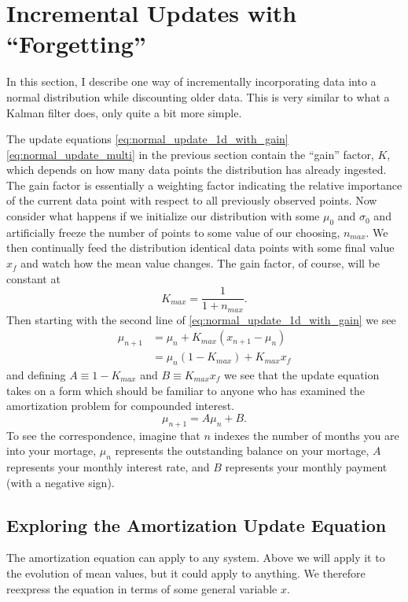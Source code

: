 \documentclass[../../main.tex]{subfiles}
\begin{document}
\section{Incremental Updates with ``Forgetting''}
In this section, I describe one way of incrementally incorporating data into a
normal distribution while discounting older data.  This is very similar to what
a Kalman filter does, only quite a bit more simple.

The update equations \eqref{eq:normal_update_1d_with_gain}
\eqref{eq:normal_update_multi} in the previous section contain the ``gain''
factor, $K$, which depends on how many data points the distribution has already
ingested.  The gain factor is essentially a weighting factor indicating the
relative importance of the current data point with respect to all previously
observed points.  Now consider what happens if we initialize our distribution
with some $\mu_0$ and $\sigma_0$ and artificially freeze the number of points to
some value of our choosing, $n_{max}$.  We then continually feed the
distribution identical data points with some final value $x_f$ and watch how
the mean value changes.  The gain factor, of course, will be constant at
\begin{equation}
    \label{eq:k_const}
    K_{max} = \frac{1}{1 + n_{max}}.
\end{equation}
Then starting with the second line of
\eqref{eq:normal_update_1d_with_gain} we see
\begin{align}
    \label{eq:interest}
    \mu_{n+1} &= \mu_n  + K_{max} \left( x_{n+1} - \mu_n \right)\nonumber\\
              &= \mu_n (1 - K_{max}) + K_{max}x_f
\end{align}
and defining $A \equiv 1-K_{max}$ and $B \equiv K_{max} x_f$
we see that the update equation takes on a form which should be familiar to
anyone who has examined the amortization problem for compounded interest.
\begin{equation}
    \label{eq:interest}
    \mu_{n+1} = A \mu_n + B.
\end{equation}
To see the correspondence, imagine that $n$ indexes the number of months you
are into your mortage, $\mu_n$ represents the outstanding balance on your
mortage, $A$ represents your monthly interest rate, and $B$ represents your
monthly payment (with a negative sign). 

\subsection{Exploring the Amortization Update Equation}
The amortization equation can apply to any system.  Above we will apply it to
the evolution of mean values, but it could apply to anything.  We therefore
reexpress the equation in terms of some general variable $x$.
\end{document}
